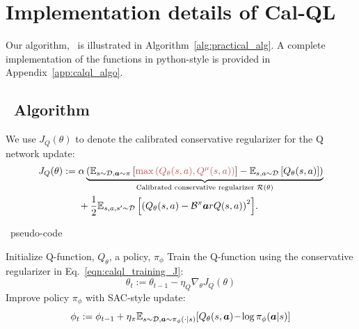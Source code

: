 \section{Implementation details of Cal-QL}
Our algorithm, \methodname\ is illustrated in Algorithm~\ref{alg:practical_alg}. A complete implementation of the functions in python-style is provided in Appendix~\ref{app:calql_algo}.

\subsection{\methodname\ Algorithm}
We use $J_Q(\theta)$ to denote the calibrated conservative regularizer for the Q network update:
\begin{align}
    \label{eqn:calql_training_J}
    J_Q(\theta):=&\;{{\alpha \underbrace{\left(\mathbb{E}_{\bs \sim \mathcal{D}, \mathbf{a} \sim \pi} \brac{{\color[HTML]{B85450}{\max \left( Q_\theta(s,a), Q^\mu(s,a) \right)}} } - \mathbb{E}_{s, a \sim \mathcal{D}}\left[Q_\theta(s,a)\right]\right)}_{\text{Calibrated conservative regularizer }\mathcal{R}(\theta)}}}\\
    &\;+ \frac{1}{2} {\mathbb{E}_{s, a, s^\prime\sim \mathcal{D}}\left[\left(Q_\theta(s, a) - \bellman^\pi\mathbf{a}r{Q}(s, a)\right)^2 \right]}.
\end{align}

\begin{center}
\begin{minipage}{0.62\linewidth}
    \begin{algorithm}[H]
    \caption{\methodname\ pseudo-code}
    \label{alg:practical_alg}
    \begin{algorithmic}[1]
        \State Initialize Q-function, $Q_\theta$, a policy, $\pi_\phi$
            \State Train the Q-function using the conservative regularizer in Eq.~\ref{eqn:calql_training_J}:
            \begin{equation}
                \theta_t := \theta_{t-1} - \eta_Q \nabla_\theta J_Q(\theta)
            \end{equation}
            \State Improve policy $\pi_\phi$ with SAC-style update:
            \begin{equation}
                \phi_{t} := \phi_{t-1} + \eta_\pi \mathbb{E}_{s \sim \mathcal{D}, \boldsymbol{a} \sim \pi_\phi(\cdot|s)}[Q_\theta(s, \boldsymbol{a})\! -\! \log \pi_\phi(\boldsymbol{a}|s)]
            \end{equation}
        \EndFor
    \end{algorithmic}
    \end{algorithm}
\end{minipage}
\end{center}

